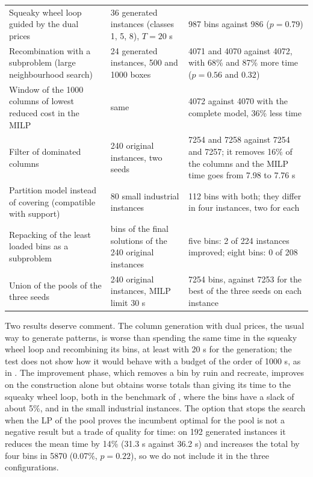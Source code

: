 \begin{table}[t]
\begin{tabular}{@{}p{3.7cm}p{4.0cm}p{7.2cm}@{}}
Squeaky wheel loop guided by the dual prices & 36 generated instances (classes 1, 5, 8), $T=20$ s & 987 bins against 986 ($p=0.79$)\\
Recombination with a subproblem (large neighbourhood search) & 24 generated instances, 500 and 1000 boxes & 4071 and 4070 against 4072, with 68\% and 87\% more time ($p=0.56$ and $0.32$)\\
Window of the 1000 columns of lowest reduced cost in the MILP & same & 4072 against 4070 with the complete model, 36\% less time\\
Filter of dominated columns & 240 original instances, two seeds & 7254 and 7258 against 7254 and 7257; it removes 16\% of the columns and the MILP time goes from 7.98 to 7.76 s\\
Partition model instead of covering (compatible with support) & 80 small industrial instances & 112 bins with both; they differ in four instances, two for each\\
Repacking of the least loaded bins as a subproblem & bins of the final solutions of the 240 original instances & five bins: 2 of 224 instances improved; eight bins: 0 of 208\\
Union of the pools of the three seeds & 240 original instances, MILP limit 30 s & 7254 bins, against 7253 for the best of the three seeds on each instance\\
\bottomrule
\end{tabular}
\end{table}

Two results deserve comment. The column generation with dual prices, the usual way to generate patterns, is worse than spending the same time in the squeaky wheel loop and recombining its bins, at least with 20 s for the
generation; the test does not show how it would behave with a budget of the order of 1000 s, as in \citet{Mahvash2018}. The improvement phase, which removes a bin by ruin and recreate, improves on the construction alone
but obtains worse totals than giving its time to the squeaky wheel loop, both in the benchmark of \citet{Martello2000}, where the bins have a slack of about 5\%, and in the small industrial instances.
The option that stops the search when the LP of the pool proves the incumbent optimal for the pool is not a negative result but a trade of quality for time: on 192 generated instances it reduces the mean time by 14\% (31.3 s against 36.2 s) and
increases the total by four bins in 5870 (0.07\%, $p=0.22$), so we do not include it in the three configurations.

